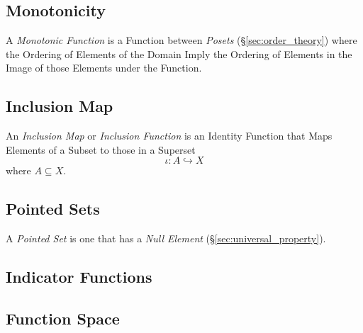 \documentclass{article}
\begin{document}
\subsection{Monotonicity}\label{subsec:monotonicity}

A \emph{Monotonic Function} is a Function between \emph{Posets}
(\S\ref{sec:order_theory}) where the Ordering of Elements of the
Domain Imply the Ordering of Elements in the Image of those Elements
under the Function.



\subsection{Inclusion Map}\label{subsec:inclusion_map}

An \emph{Inclusion Map} or \emph{Inclusion Function} is an Identity
Function that Maps Elements of a Subset to those in a Superset
\[
    \iota : A \hookrightarrow X
\]
where $A \subseteq X$.



\subsection{Pointed Sets}

A \emph{Pointed Set} is one that has a \emph{Null Element}
(\S\ref{sec:universal_property}).



\subsection{Indicator Functions}\label{subsec:indicator_function}

\subsection{Function Space}\label{subsec:function_space}
\end{document}
